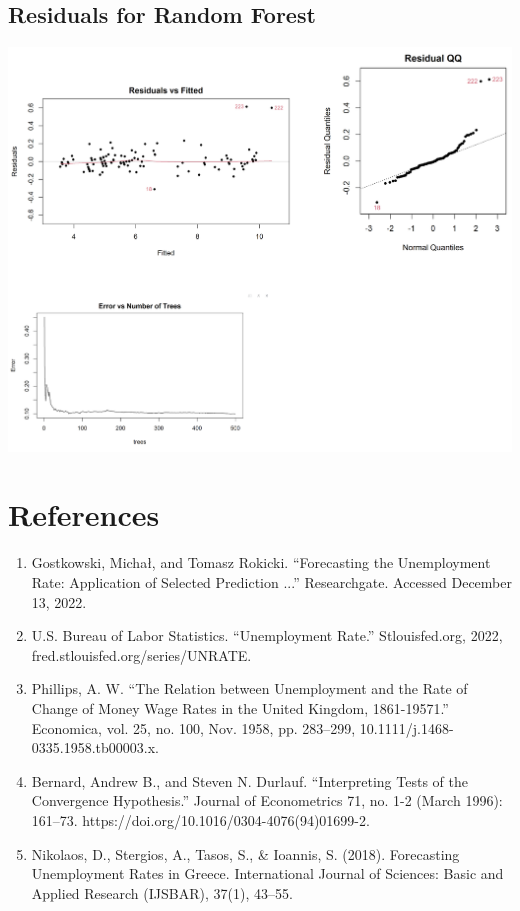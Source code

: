 \documentclass{article}
\begin{document}
\subsection{Residuals for Random Forest}
	\begin{center}
		\includegraphics[width=1\textwidth]{assets/residual4.png}
	\end{center}

	\section{References}
		\begin{enumerate}
			\item Gostkowski, Michał, and Tomasz Rokicki. “Forecasting the Unemployment Rate: Application of Selected Prediction ...” Researchgate. Accessed December 13, 2022.
			\item U.S. Bureau of Labor Statistics. “Unemployment Rate.” Stlouisfed.org, 2022, \newline fred.stlouisfed.org/series/UNRATE.
			\item Phillips, A. W. “The Relation between Unemployment and the Rate of Change of Money Wage Rates in the United Kingdom, 1861-19571.” Economica, vol. 25, no. 100, Nov. 1958, pp. 283–299, 10.1111/j.1468-0335.1958.tb00003.x.
			\item Bernard, Andrew B., and Steven N. Durlauf. “Interpreting Tests of the Convergence Hypothesis.” Journal of Econometrics 71, no. 1-2 (March 1996): 161–73. https://doi.org/10.1016/0304-4076(94)01699-2.
			\item Nikolaos, D., Stergios, A., Tasos, S., \& Ioannis, S. (2018). Forecasting Unemployment Rates in Greece. International Journal of Sciences: Basic and Applied Research (IJSBAR), 37(1), 43–55.
		\end{enumerate}
\end{document}
